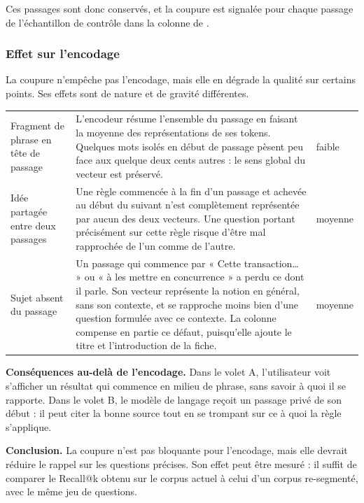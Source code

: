 Ces passages sont donc conservés, et la coupure est signalée pour chaque passage de l'échantillon de
contrôle dans la colonne  de .

\subsubsection{Effet sur l'encodage}

La coupure n'empêche pas l'encodage, mais elle en dégrade la qualité sur certains points. Ses effets
sont de nature et de gravité différentes.

\begin{tabletype}
\begin{tabularx}{\textwidth}{@{}L{4.3cm}Y L{2.3cm}@{}}
\toprule
{} &  &  \\
\midrule
Fragment de phrase en tête de passage & L'encodeur résume l'ensemble du passage en faisant la moyenne des représentations de ses tokens. Quelques mots isolés en début de passage pèsent peu face aux quelque deux cents autres : le sens global du vecteur est préservé. & faible \\
Idée partagée entre deux passages & Une règle commencée à la fin d'un passage et achevée au début du suivant n'est complètement représentée par aucun des deux vecteurs. Une question portant précisément sur cette règle risque d'être mal rapprochée de l'un comme de l'autre. & moyenne \\
Sujet absent du passage & Un passage qui commence par « Cette transaction… » ou « à les mettre en concurrence » a perdu ce dont il parle. Son vecteur représente la notion en général, sans son contexte, et se rapproche moins bien d'une question formulée avec ce contexte. La colonne  compense en partie ce défaut, puisqu'elle ajoute le titre et l'introduction de la fiche. & moyenne \\
\bottomrule
\end{tabularx}
\end{tabletype}

\textbf{Conséquences au-delà de l'encodage.} Dans le volet A, l'utilisateur voit s'afficher un
résultat qui commence en milieu de phrase, sans savoir à quoi il se rapporte. Dans le volet B, le
modèle de langage reçoit un passage privé de son début : il peut citer la bonne source tout en se
trompant sur ce à quoi la règle s'applique.

\textbf{Conclusion.} La coupure n'est pas bloquante pour l'encodage, mais elle devrait réduire le rappel
sur les questions précises. Son effet peut être mesuré : il suffit de comparer le Recall@k obtenu sur le
corpus actuel à celui d'un corpus re-segmenté, avec le même jeu de questions.

